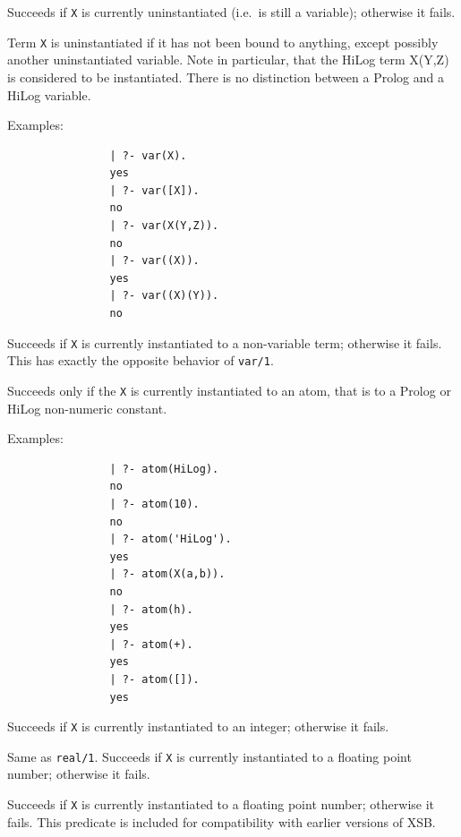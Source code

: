 \begin{description}
    Succeeds if {\tt X} is currently uninstantiated (i.e.\ is still a 
    variable); otherwise it fails.  

    Term {\tt X} is uninstantiated if it has not been bound to anything, 
    except possibly another uninstantiated variable. Note in particular,
    that the HiLog term X(Y,Z) is considered to be instantiated.  There 
    is no distinction between a Prolog and a HiLog variable.

    Examples:
    {\footnotesize
     \begin{verbatim}
                | ?- var(X).
                yes
                | ?- var([X]).
                no
                | ?- var(X(Y,Z)).
                no
                | ?- var((X)).
                yes
                | ?- var((X)(Y)).
                no
     \end{verbatim}}


    Succeeds if {\tt X} is currently instantiated to a non-variable term;
    otherwise it fails. This has exactly the opposite behavior of 
    {\tt var/1}\@.

    Succeeds only if the {\tt X} is currently instantiated to an atom, that
    is to a Prolog or HiLog non-numeric constant.

    Examples:
    {\footnotesize
     \begin{verbatim}
                | ?- atom(HiLog).
                no
                | ?- atom(10).
                no
                | ?- atom('HiLog').
                yes
                | ?- atom(X(a,b)).
                no
                | ?- atom(h).
                yes
                | ?- atom(+).
                yes
                | ?- atom([]).
                yes
     \end{verbatim}}

    Succeeds if {\tt X} is currently instantiated to an integer; 
    otherwise it fails. 

    Same as {\tt real/1}. Succeeds if {\tt X} is currently instantiated 
    to a floating point number; otherwise it fails.  
	
%
Succeeds if {\tt X} is currently instantiated to a floating point
number; otherwise it fails. This predicate is included for
compatibility with earlier versions of XSB.


\end{description}
